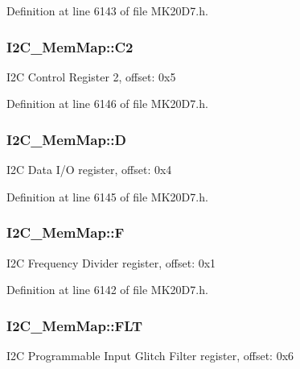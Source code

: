 Definition at line 6143 of file M\+K20\+D7.\+h.

\subsubsection[{\texorpdfstring{C2}{C2}}]{ I2\+C\+\_\+\+Mem\+Map\+::\+C2}\hypertarget{struct_i2_c___mem_map_a5e8189de70defa55b4d4d50e42ac88d1}{}\label{struct_i2_c___mem_map_a5e8189de70defa55b4d4d50e42ac88d1}
I2C Control Register 2, offset\+: 0x5 

Definition at line 6146 of file M\+K20\+D7.\+h.

\subsubsection[{\texorpdfstring{D}{D}}]{ I2\+C\+\_\+\+Mem\+Map\+::D}\hypertarget{struct_i2_c___mem_map_a44f0a2e82a172b16e1241939185790cf}{}\label{struct_i2_c___mem_map_a44f0a2e82a172b16e1241939185790cf}
I2C Data I/O register, offset\+: 0x4 

Definition at line 6145 of file M\+K20\+D7.\+h.

\subsubsection[{\texorpdfstring{F}{F}}]{ I2\+C\+\_\+\+Mem\+Map\+::F}\hypertarget{struct_i2_c___mem_map_a9f07a2e505dda38873798958a6c9f432}{}\label{struct_i2_c___mem_map_a9f07a2e505dda38873798958a6c9f432}
I2C Frequency Divider register, offset\+: 0x1 

Definition at line 6142 of file M\+K20\+D7.\+h.

\subsubsection[{\texorpdfstring{F\+LT}{FLT}}]{ I2\+C\+\_\+\+Mem\+Map\+::\+F\+LT}\hypertarget{struct_i2_c___mem_map_a6520708827670dc2938e6cdec0264763}{}\label{struct_i2_c___mem_map_a6520708827670dc2938e6cdec0264763}
I2C Programmable Input Glitch Filter register, offset\+: 0x6 

